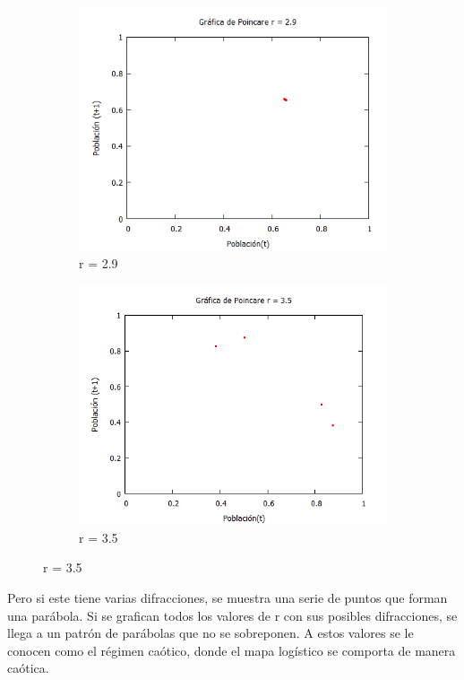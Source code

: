 \documentclass[12pt]{article}
\begin{document}
\begin{figure}[h!]
\begin{subfigure}{.5\textwidth}
  \centering
  \includegraphics[width=.7\linewidth]{Poi1.png}
  \caption{r = 2.9}
  \label{fig:sfig1}
\end{subfigure}%
\begin{subfigure}{.5\textwidth}
  \centering
  \includegraphics[width=.7\linewidth]{Poi2.png}
  \caption{r = 3.5}
  \label{fig:sfig2}
\end{subfigure}
\end{figure}

Pero si este tiene varias difracciones, se muestra una serie de puntos que forman una parábola. Si se grafican todos los valores de r con sus posibles difracciones, se llega a un patrón de parábolas que no se sobreponen. A estos valores se le conocen como el régimen caótico, donde el mapa logístico se comporta de manera caótica.
\end{document}
